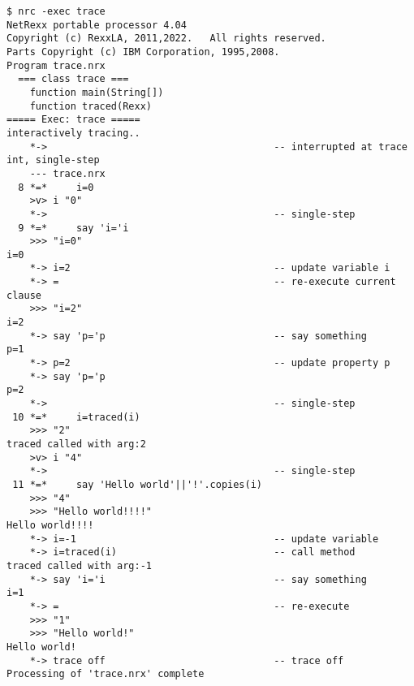\begin{lstlisting}
$ nrc -exec trace
NetRexx portable processor 4.04
Copyright (c) RexxLA, 2011,2022.   All rights reserved.
Parts Copyright (c) IBM Corporation, 1995,2008.
Program trace.nrx
  === class trace ===
    function main(String[])
    function traced(Rexx)
===== Exec: trace =====
interactively tracing..
    *->                                       -- interrupted at trace int, single-step
    --- trace.nrx
  8 *=*     i=0
    >v> i "0"
    *->                                       -- single-step
  9 *=*     say 'i='i 
    >>> "i=0"
i=0
    *-> i=2                                   -- update variable i
    *-> =                                     -- re-execute current clause
    >>> "i=2"
i=2
    *-> say 'p='p                             -- say something
p=1
    *-> p=2                                   -- update property p
    *-> say 'p='p
p=2
    *->                                       -- single-step
 10 *=*     i=traced(i)                       
    >>> "2"
traced called with arg:2
    >v> i "4"
    *->                                       -- single-step
 11 *=*     say 'Hello world'||'!'.copies(i)
    >>> "4"
    >>> "Hello world!!!!"
Hello world!!!!
    *-> i=-1                                  -- update variable
    *-> i=traced(i)                           -- call method
traced called with arg:-1
    *-> say 'i='i                             -- say something
i=1
    *-> =                                     -- re-execute
    >>> "1"
    >>> "Hello world!"
Hello world!
    *-> trace off                             -- trace off
Processing of 'trace.nrx' complete

\end{lstlisting}
